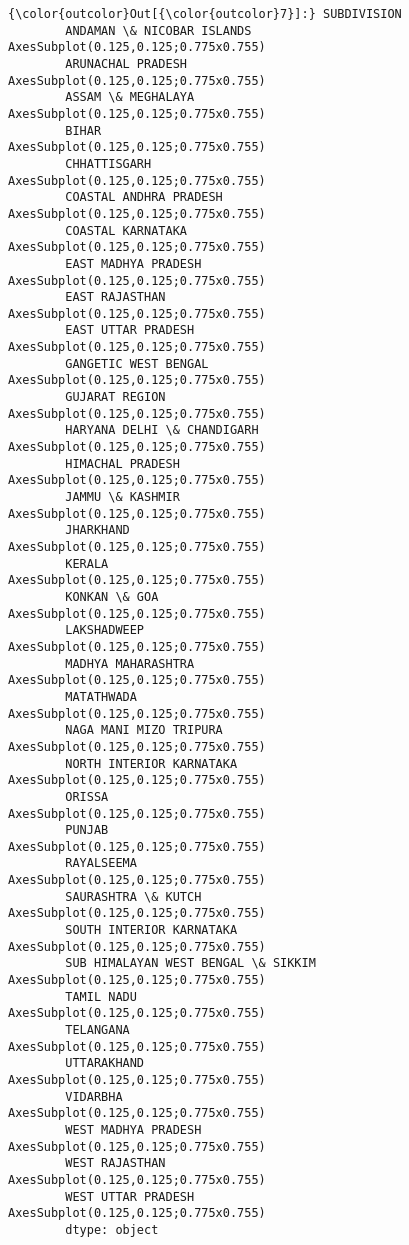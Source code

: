 \documentclass[11pt]{article}
\begin{document}
\begin{Verbatim}[commandchars=\\\{\}]
{\color{outcolor}Out[{\color{outcolor}7}]:} SUBDIVISION
        ANDAMAN \& NICOBAR ISLANDS             AxesSubplot(0.125,0.125;0.775x0.755)
        ARUNACHAL PRADESH                     AxesSubplot(0.125,0.125;0.775x0.755)
        ASSAM \& MEGHALAYA                     AxesSubplot(0.125,0.125;0.775x0.755)
        BIHAR                                 AxesSubplot(0.125,0.125;0.775x0.755)
        CHHATTISGARH                          AxesSubplot(0.125,0.125;0.775x0.755)
        COASTAL ANDHRA PRADESH                AxesSubplot(0.125,0.125;0.775x0.755)
        COASTAL KARNATAKA                     AxesSubplot(0.125,0.125;0.775x0.755)
        EAST MADHYA PRADESH                   AxesSubplot(0.125,0.125;0.775x0.755)
        EAST RAJASTHAN                        AxesSubplot(0.125,0.125;0.775x0.755)
        EAST UTTAR PRADESH                    AxesSubplot(0.125,0.125;0.775x0.755)
        GANGETIC WEST BENGAL                  AxesSubplot(0.125,0.125;0.775x0.755)
        GUJARAT REGION                        AxesSubplot(0.125,0.125;0.775x0.755)
        HARYANA DELHI \& CHANDIGARH            AxesSubplot(0.125,0.125;0.775x0.755)
        HIMACHAL PRADESH                      AxesSubplot(0.125,0.125;0.775x0.755)
        JAMMU \& KASHMIR                       AxesSubplot(0.125,0.125;0.775x0.755)
        JHARKHAND                             AxesSubplot(0.125,0.125;0.775x0.755)
        KERALA                                AxesSubplot(0.125,0.125;0.775x0.755)
        KONKAN \& GOA                          AxesSubplot(0.125,0.125;0.775x0.755)
        LAKSHADWEEP                           AxesSubplot(0.125,0.125;0.775x0.755)
        MADHYA MAHARASHTRA                    AxesSubplot(0.125,0.125;0.775x0.755)
        MATATHWADA                            AxesSubplot(0.125,0.125;0.775x0.755)
        NAGA MANI MIZO TRIPURA                AxesSubplot(0.125,0.125;0.775x0.755)
        NORTH INTERIOR KARNATAKA              AxesSubplot(0.125,0.125;0.775x0.755)
        ORISSA                                AxesSubplot(0.125,0.125;0.775x0.755)
        PUNJAB                                AxesSubplot(0.125,0.125;0.775x0.755)
        RAYALSEEMA                            AxesSubplot(0.125,0.125;0.775x0.755)
        SAURASHTRA \& KUTCH                    AxesSubplot(0.125,0.125;0.775x0.755)
        SOUTH INTERIOR KARNATAKA              AxesSubplot(0.125,0.125;0.775x0.755)
        SUB HIMALAYAN WEST BENGAL \& SIKKIM    AxesSubplot(0.125,0.125;0.775x0.755)
        TAMIL NADU                            AxesSubplot(0.125,0.125;0.775x0.755)
        TELANGANA                             AxesSubplot(0.125,0.125;0.775x0.755)
        UTTARAKHAND                           AxesSubplot(0.125,0.125;0.775x0.755)
        VIDARBHA                              AxesSubplot(0.125,0.125;0.775x0.755)
        WEST MADHYA PRADESH                   AxesSubplot(0.125,0.125;0.775x0.755)
        WEST RAJASTHAN                        AxesSubplot(0.125,0.125;0.775x0.755)
        WEST UTTAR PRADESH                    AxesSubplot(0.125,0.125;0.775x0.755)
        dtype: object
\end{Verbatim}
            
\end{document}
